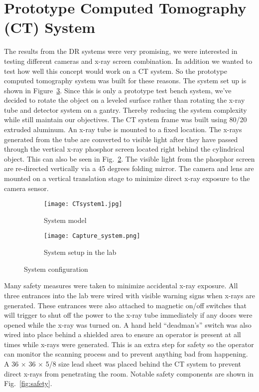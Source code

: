 \section{Prototype Computed Tomography (CT) System}
The results from the DR systems were very promising, we were interested in testing different cameras and x-ray screen combination.  In addition we wanted to test how well this concept would work on a CT system.  So the prototype computed tomography system was built for these reasons.  The system set up is shown in Figure~\ref{fig:CTsystem}.  Since this is only a prototype test bench system, we've decided to rotate the object on a leveled surface rather than rotating the x-ray tube and detector system on a gantry.  Thereby reducing the system complexity while still maintain our objectives.  The CT system frame was built using 80/20 extruded aluminum.  An x-ray tube is mounted to a fixed location.  The x-rays generated from the tube are converted to visible light after they have passed through the vertical x-ray phosphor screen located right behind the cylindrical object.  This can also be seen in Fig.~\ref{fig:CTlab}.  The visible light from the phosphor screen are re-directed vertically via a 45 degrees folding mirror.  The camera and lens are mounted on a vertical translation stage to minimize direct x-ray exposure to the camera sensor.

\begin{figure}[h]
	\begin{subfigure}[b]{0.45\linewidth}
	\centering
	\texttt{[image: CTsystem1.jpg]}
	\caption{System model}
	\label{fig:CTmodel}
	\end{subfigure}
\hspace{1 cm}
	\begin{subfigure}[b]{0.45\linewidth}
	\centering
	\texttt{[image: Capture\_system.png]}
	\caption{System setup in the lab}
	\label{fig:CTlab}
	\end{subfigure}
\caption{System configuration}
\label{fig:CTsystem}
\end{figure}

Many safety measures were taken to minimize accidental x-ray exposure.  All three entrances into the lab were wired with visible warning signs when x-rays are generated.  These entrances were also attached to magnetic on/off switches that will trigger to shut off the power to the x-ray tube immediately if any doors were opened while the x-ray was turned on.  A hand held ``deadman's'' switch was also wired into place behind a shielded area to ensure an operator is present at all times while x-rays were generated. This is an extra step for safety so the operator can monitor the scanning process and to prevent anything bad from happening.  A 36 \inches $\times$ 36 \inches $\times$ 5/8 \inches size lead sheet was placed behind the CT system to prevent direct x-rays from penetrating the room.  Notable safety components are shown in Fig.~\ref{fig:safety}.

